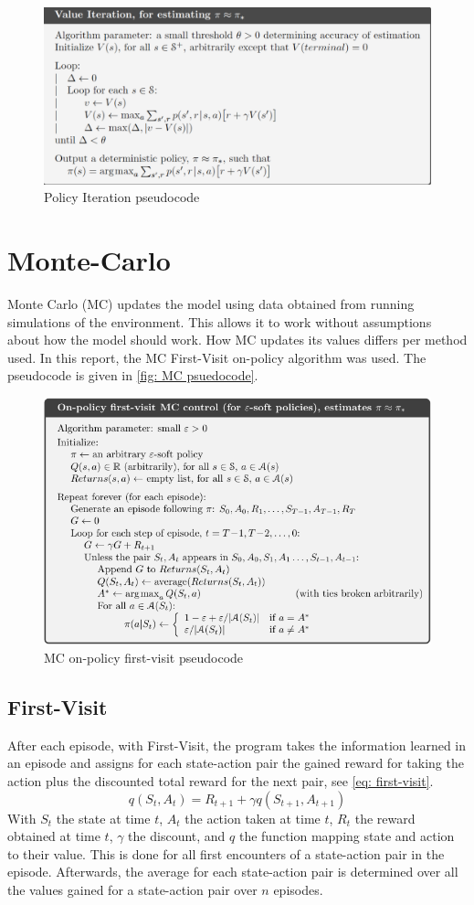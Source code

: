\documentclass{class}
\begin{document}
\begin{figure}[H]
    \centering
    \includegraphics[width=0.5\linewidth]{images/value_iteration.png}
    \caption{Policy Iteration pseudocode \parencite[p. 80]{sutton-2018}}
    \label{fig:value_iteration_pseudocode}
\end{figure}
\section{Monte-Carlo}

\label{sec: monte-carlo}
Monte Carlo (MC) updates the model using data obtained from running simulations of the environment. This allows it to work without assumptions about how the model should work. How MC updates its values differs per method used. In this report, the MC First-Visit on-policy algorithm was used. The pseudocode is given in \autoref{fig: MC psuedocode}.
\begin{figure}[H]
    \centering
    \includegraphics[width=0.5\linewidth]{images/mc_on_policy_first_visit.png}
    \caption{MC on-policy first-visit pseudocode \parencite[p. 101]{sutton-2018}}
    \label{fig: MC psuedocode}
\end{figure}

\subsection{First-Visit}
After each episode, with First-Visit, the program takes the information learned in an episode and assigns for each state-action pair the gained reward for taking the action plus the discounted total reward for the next pair, see \autoref{eq: first-visit}.
\begin{equation}
    \label{eq: first-visit}
    q(S_t,A_t) = R_{t+1}+\gamma q(S_{t+1},A_{t+1})
\end{equation}
With $S_t$ the state at time $t$, $A_t$ the action taken at time $t$, $R_t$ the reward obtained at time $t$, $\gamma$ the discount, and $q$ the function mapping state and action to their value. This is done for all first encounters of a state-action pair in the episode. Afterwards, the average for each state-action pair is determined over all the values gained for a state-action pair over $n$ episodes.
\end{document}
